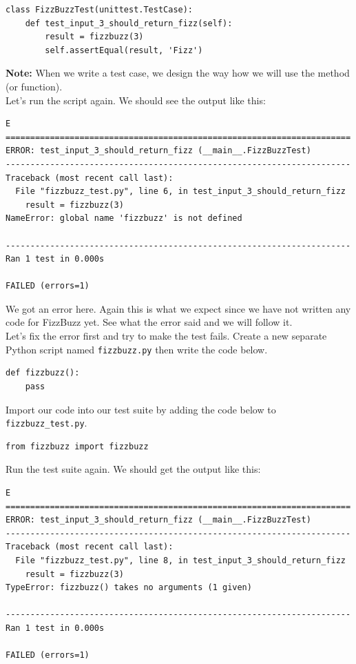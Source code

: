\documentclass{article}
\begin{document}
\begin{verbatim}
class FizzBuzzTest(unittest.TestCase):
    def test_input_3_should_return_fizz(self):
        result = fizzbuzz(3)
        self.assertEqual(result, 'Fizz')
\end{verbatim}

\noindent \textbf{Note:} When we write a test case, we design the way how we
will use the method (or function). \\

\noindent Let's run the script again. We should see the output like this:

\begin{verbatim}
E
======================================================================
ERROR: test_input_3_should_return_fizz (__main__.FizzBuzzTest)
----------------------------------------------------------------------
Traceback (most recent call last):
  File "fizzbuzz_test.py", line 6, in test_input_3_should_return_fizz
    result = fizzbuzz(3)
NameError: global name 'fizzbuzz' is not defined

----------------------------------------------------------------------
Ran 1 test in 0.000s

FAILED (errors=1)
\end{verbatim}

\noindent We got an error here. Again this is what we expect since we have not
written any code for FizzBuzz yet. See what the error said and we will follow
it. \\

\noindent Let's fix the error first and try to make the test fails. Create a
new separate Python script named {\tt fizzbuzz.py} then write the code below.

\begin{verbatim}
def fizzbuzz():
    pass
\end{verbatim}

\noindent Import our code into our test suite by adding the code below to {\tt
fizzbuzz\_test.py}.

\begin{verbatim}
from fizzbuzz import fizzbuzz
\end{verbatim}

\noindent Run the test suite again. We should get the output like this:

\begin{verbatim}
E
======================================================================
ERROR: test_input_3_should_return_fizz (__main__.FizzBuzzTest)
----------------------------------------------------------------------
Traceback (most recent call last):
  File "fizzbuzz_test.py", line 8, in test_input_3_should_return_fizz
    result = fizzbuzz(3)
TypeError: fizzbuzz() takes no arguments (1 given)

----------------------------------------------------------------------
Ran 1 test in 0.000s

FAILED (errors=1)
\end{verbatim}
\end{document}
